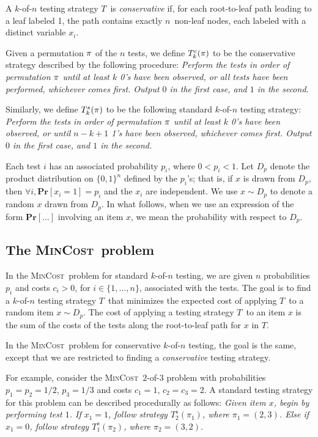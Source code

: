 \documentclass{article}
\newcounter{ass}
\newcommand{\ens}[1]{\ensuremath{#1}}					\newcommand{\card}[1]{\ens{|#1|}}							\newcommand{\dotlist}[2]{\ens{#1,\ldots,#2}}
\newcommand{\anitem}{\ens{x}}
\newcommand{\valn}{\ens{n}}
\newcommand{\valk}{\ens{k}}
\newcommand{\mincost}{\textsc{MinCost}}
\newcommand{\kofn}{\valk-of-\valn}
\newcommand{\strategy}{\ens{T}}
\newcommand{\retval}[1]{\ens{\anitem_{#1}}}					\newcommand{\pr}[1]{\ens{p_{#1}}}									\newcommand{\qr}[1]{\ens{q_{#1}}}									\newcommand{\op}[1]{\ens{O_{#1}}}									\newcommand{\megaop}[1]{\ens{E_{#1}}}
\newcommand{\test}[1]{\ens{#1}}										\newcommand{\cost}[1]{\ens{c_{#1}}}								\newcommand{\rate}[1]{\ens{r_{#1}}}								\newcommand{\resrate}[1]{\ens{r'_{#1}}}							\newcommand{\landprob}[2]{\ens{g(#1,#2)}}					\newcommand{\cstrat}[2]{\ens{\strategy^c_{#1}(#2)}}				\newcommand{\sstrat}[2]{\ens{\strategy^s_{#1}(#2)}}				\newcommand{\varz}[1]{\ens{z_{#1}}}								\newcommand{\vary}[1]{\ens{y_{#1}}}
\newcommand{\probgen}[1]{\ens{\mathbf{Pr}\left[#1\right]}}
\begin{document}
A \kofn{} testing strategy \strategy\ is {\em conservative} if, 
for each root-to-leaf path leading
to a leaf labeled 1, the path contains exactly \valn\ non-leaf nodes,
each labeled with a distinct variable $\retval{i}$.

Given a permutation $\perm$ of the $n$ tests, we define 
\cstrat{\valk}{\perm} to be the conservative strategy described by the following procedure:
{\it Perform the tests
in order of permutation $\perm$ until at least $\valk$ 0's have been observed,
or all tests have been performed, whichever
comes first.  Output $0$ in the first case, and $1$ in the second.}


Similarly, we define \sstrat{\valk}{\perm} to be the following
standard \kofn{} testing strategy:
{\it Perform the tests
in order of permutation $\perm$ until at least $\valk$ 0's have been observed,
or until $n-\valk+1$ 1's have been observed, whichever
comes first.  Output $0$ in the first case, and $1$ in the second.}

Each test $\test i$ has an associated probability $\pr i$, where $0 < \pr i < 1$.
Let $D_p$ denote the product distribution on $\{0,1\}^{\valn}$ 
defined by the $\pr i$'s; that is, if $x$ is drawn from $D_p$, then
$\forall i, \probgen{\retval i=1}=\pr i$ and the \retval{i} are independent.
We use $x \sim D_p$ to denote a random $x$ drawn from $D_p$.
In what follows, when we use an expression of 
the form $\probgen{\ldots}$  involving 
an item $\anitem$, we mean the probability with respect to $D_p$.


\subsection{The \mincost\ problem}
\label{sec:mincostdef}
In the \mincost\ problem for standard \kofn{} testing,
we are given $\valn$ probabilities $\pr i$ and costs $\cost i>0$, for $i \in \{1,\ldots, \valn\}$, associated with the tests.
The goal is to find a \kofn{} testing strategy \strategy\ that minimizes
the expected cost of applying \strategy\ to a random item $\anitem \sim D_p$.
The cost of applying a
testing strategy \strategy\ to an item
\anitem{} is the sum of the costs of the tests along the root-to-leaf 
path for \anitem{} in \strategy. 

In the \mincost\ problem for conservative \kofn{} testing, the goal is the same,
except that we are restricted to finding a {\em conservative} testing strategy.

For example, consider the \mincost\ $2$-of-$3$ problem with probabilities $\pr{1}=\pr{2}=1/2$, $\pr{3}=1/3$ and costs $\cost{1}=1$, $\cost{2}=\cost{3}=2$.
A standard testing strategy for this problem can be
described procedurally as follows: {\em Given item $\anitem$, begin by performing test $1$.  
If $\retval{1} = 1$, 
follow strategy $\sstrat{2}{\pi_1}$, where $\pi_1 = (2,3)$.
Else if $\retval{1}=0$, 
follow strategy $\sstrat{1}{\pi_2}$, where $\pi_2 = (3,2)$.}
\end{document}
